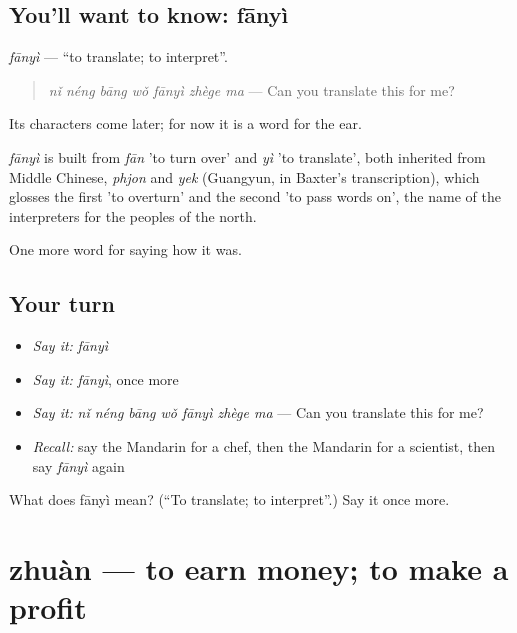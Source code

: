 \subsection*{You'll want to know: fānyì}
\emph{fānyì} — \textquotedblleft{}to translate; to interpret\textquotedblright{}.

\begin{quote}
\emph{nǐ néng bāng wǒ fānyì zhège ma} — Can you translate this for me?
\end{quote}

Its characters come later; for now it is a word for the ear.

\begin{cousinweb}
\emph{fānyì} is built from \emph{fān} 'to turn over' and \emph{yì} 'to translate', both inherited from Middle Chinese, \emph{phjon} and \emph{yek} (Guangyun, in Baxter's transcription), which glosses the first 'to overturn' and the second 'to pass words on', the name of the interpreters for the peoples of the north.
\end{cousinweb}

\begin{grammarlens}[title={What you've built}]
One more word for saying how it was.
\end{grammarlens}

\subsection*{Your turn}
\begin{itemize}
\raggedright
  \item \emph{Say it:} \emph{fānyì}
  \item \emph{Say it:} \emph{fānyì}, once more
  \item \emph{Say it:} \emph{nǐ néng bāng wǒ fānyì zhège ma} — Can you translate this for me?
  \item \emph{Recall:} say the Mandarin for a chef, then the Mandarin for a scientist, then say \emph{fānyì} again
\end{itemize}

\begin{tcolorbox}[breakable,colback=teal!4,colframe=teal!35!black,title={Before you move on}]
What does fānyì mean? (\textquotedblleft{}To translate; to interpret\textquotedblright{}.) Say it once more.
\end{tcolorbox}
\section[zhuàn]{zhuàn — to earn money; to make a profit}

